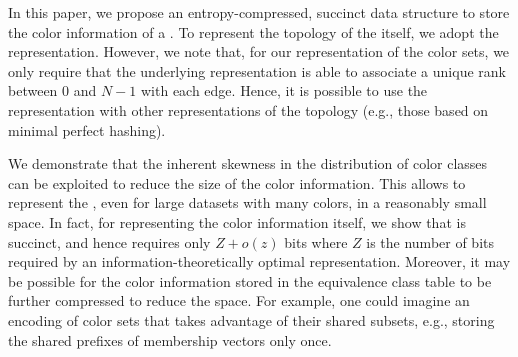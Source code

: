 In this paper, we propose an entropy-compressed, succinct data structure to
store the color information of a \cdbg. To represent the topology of the \dbg
itself, we adopt the \boss~\cite{BoweOn12} representation. However, we note
that, for our representation of the color sets, we only require that the
underlying \dbg representation is able to associate a unique rank between $0$
and $N-1$ with each edge. Hence, it is possible to use the \system
representation with other representations of the \dbg topology (e.g., those
based on minimal perfect hashing).

We demonstrate that the inherent skewness in the distribution of color classes
can be exploited to reduce the size of the color information. This allows
\system to represent the \cdbg, even for large datasets with many colors, in a
reasonably small space. In fact, for representing the color information itself,
we show that \system is succinct, and hence requires only $Z + o(z)$ bits where
$Z$ is the number of bits required by an information-theoretically optimal
representation.
%
Moreover, it may be possible for the color information stored in the equivalence
class table to be further compressed to reduce the space. For example, one could
imagine an encoding of color sets that takes advantage of their shared subsets,
e.g., storing the shared prefixes of membership vectors only once.
%


